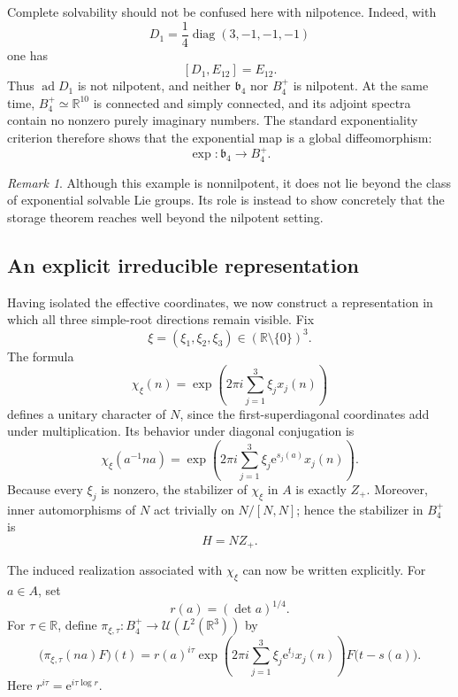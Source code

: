 \documentclass[reqno]{amsart}
\numberwithin{equation}{section}
\theoremstyle{definition}
\theoremstyle{remark}
\newtheorem{remark}[theorem]{Remark}
\newcommand{\R}{\mathbb R}
\newcommand{\U}{\mathcal U}
\newcommand{\ad}{\operatorname{ad}}
\newcommand{\e}{\mathrm e}
\begin{document}
Complete solvability should not be confused here with nilpotence.  Indeed,
with
\[
 D_1=\frac14\operatorname{diag}(3,-1,-1,-1)
\]
one has
\[
 [D_1,E_{12}]=E_{12}.
\]
Thus $\ad D_1$ is not nilpotent, and neither $\mathfrak b_4$ nor
$B_4^+$ is nilpotent.  At the same time, $B_4^+\simeq\R^{10}$ is connected
and simply connected, and its adjoint spectra contain no nonzero purely
imaginary numbers.  The standard exponentiality criterion therefore shows
that the exponential map is a global diffeomorphism:
\[
 \exp:\mathfrak b_4\longrightarrow B_4^+.
\]

\begin{remark}
Although this example is nonnilpotent, it does not lie beyond the class of
exponential solvable Lie groups.  Its role is instead to show concretely that
the storage theorem reaches well beyond the nilpotent setting.
\end{remark}

\subsection{An explicit irreducible representation}

Having isolated the effective coordinates, we now construct a representation
in which all three simple-root directions remain visible.  Fix
\[
 \xi=(\xi_1,\xi_2,\xi_3)\in(\R\setminus\{0\})^3.
\]
The formula
\begin{equation}
 \chi_\xi(n)
 =\exp\left(2\pi i\sum_{j=1}^3\xi_jx_j(n)\right)
 \label{eq:B4-N-character}
\end{equation}
defines a unitary character of $N$, since the first-superdiagonal coordinates
add under multiplication.  Its behavior under diagonal conjugation is
\[
 \chi_\xi(a^{-1}na)
 =\exp\left(
 2\pi i\sum_{j=1}^3\xi_j\e^{s_j(a)}x_j(n)
 \right).
\]
Because every $\xi_j$ is nonzero, the stabilizer of $\chi_\xi$ in $A$ is
exactly $Z_+$.  Moreover, inner automorphisms of $N$ act trivially on
$N/[N,N]$; hence the stabilizer in $B_4^+$ is
\[
 H=NZ_+.
\]

The induced realization associated with $\chi_\xi$ can now be written
explicitly.
For $a\in A$, set
\[
 r(a)=(\det a)^{1/4}.
\]
For $\tau\in\R$, define
$\pi_{\xi,\tau}:B_4^+\to\U(L^2(\R^3))$ by
\begin{equation}
 \bigl(\pi_{\xi,\tau}(na)F\bigr)(t)
 =r(a)^{i\tau}
 \exp\left(
 2\pi i\sum_{j=1}^3\xi_j\e^{t_j}x_j(n)
 \right)
 F\bigl(t-s(a)\bigr).
 \label{eq:B4-explicit-representation}
\end{equation}
Here $r^{i\tau}=\e^{i\tau\log r}$.
\end{document}
